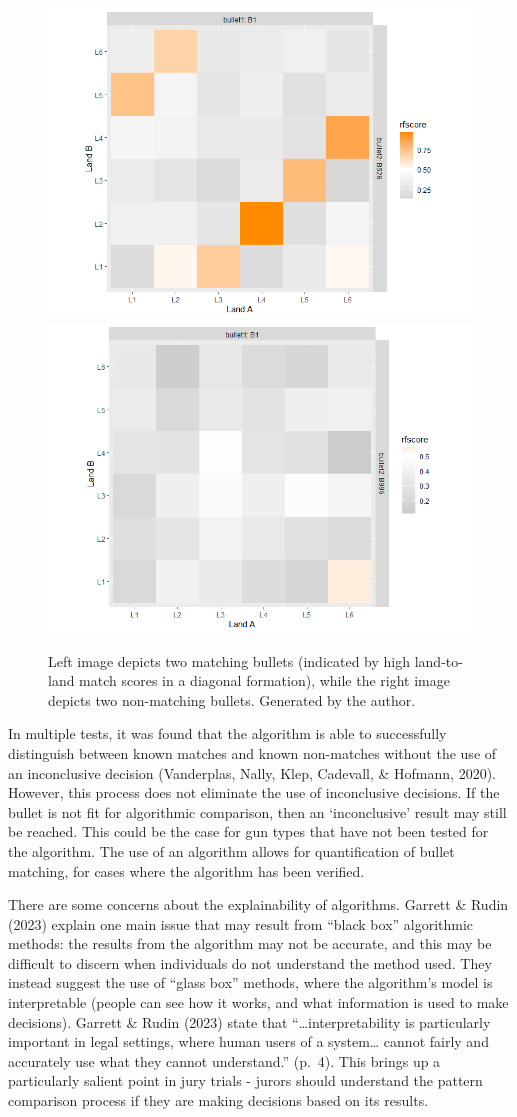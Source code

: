 \documentclass[print]{nuthesis}
\begin{document}
\begin{figure}

{\centering \includegraphics[width=0.49\linewidth]{images/F526_Match_SingleGrid} \includegraphics[width=0.49\linewidth]{images/K995_NoMatch_SingleGrid} 

}

\caption[Left image depicts two matching bullets, while the right image depicts two non-matching bullets.]{Left image depicts two matching bullets (indicated by high land-to-land match scores in a diagonal formation), while the right image depicts two non-matching bullets. Generated by the author.}\label{fig:gridcompare}
\end{figure}

In multiple tests, it was found that the algorithm is able to successfully distinguish between known matches and known non-matches without the use of an inconclusive decision (Vanderplas, Nally, Klep, Cadevall, \& Hofmann, 2020).
However, this process does not eliminate the use of inconclusive decisions.
If the bullet is not fit for algorithmic comparison, then an `inconclusive' result may still be reached.
This could be the case for gun types that have not been tested for the algorithm.
The use of an algorithm allows for quantification of bullet matching, for cases where the algorithm has been verified.

There are some concerns about the explainability of algorithms.
Garrett \& Rudin (2023) explain one main issue that may result from ``black box'' algorithmic methods: the results from the algorithm may not be accurate, and this may be difficult to discern when individuals do not understand the method used.
They instead suggest the use of ``glass box'' methods, where the algorithm's model is interpretable (people can see how it works, and what information is used to make decisions).
Garrett \& Rudin (2023) state that ``\ldots interpretability is particularly important in legal settings, where human users of a system\ldots{} cannot fairly and accurately use what they cannot understand.'' (p.~4).
This brings up a particularly salient point in jury trials - jurors should understand the pattern comparison process if they are making decisions based on its results.
\end{document}
